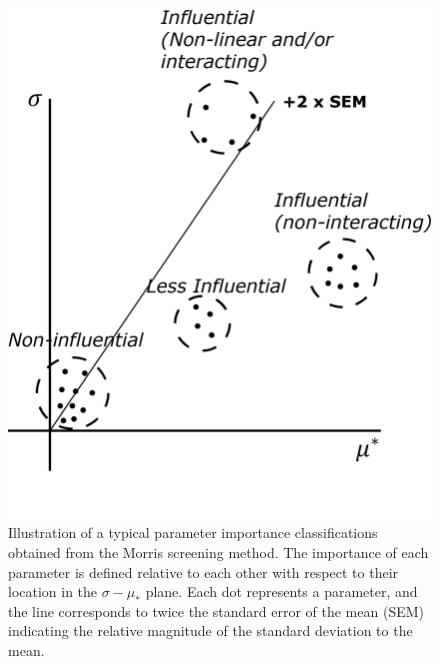 \begin{figure}[bth]
	\centering
	\includegraphics[scale=0.90]{../figures/illustrateMorrisResult/illustrateMorrisResult.png}
	\caption[Illustration of a typical parameter importance classification based on Morris screening method]{Illustration of a typical parameter importance classifications obtained from the Morris screening method. The importance of each parameter is defined relative to each other with respect to their location in the $\sigma - \mu_*$ plane. Each dot represents a parameter, and the line corresponds to twice the standard error of the mean (SEM) indicating the relative magnitude of the standard deviation to the mean.}\label{fig:illustration_morris_result}
\end{figure}
